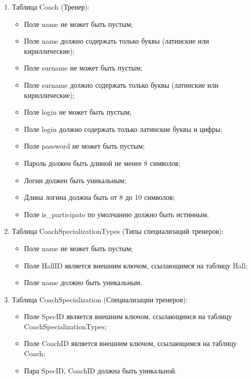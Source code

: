\begin{enumerate}
    \item Таблица Coach (Тренер):
    \begin{itemize}
        \item[---] Поле name не может быть пустым;
        \item[---] Поле name должно содержать только буквы (латинские или кириллические);
        \item[---] Поле surname не может быть пустым;
        \item[---] Поле surname должно содержать только буквы (латинские или кириллические);
        \item[---] Поле login не может быть пустым;
        \item[---] Поле login должно содержать только латинские буквы и цифры;
        \item[---] Поле password не может быть пустым;
        \item[---] Пароль должен быть длиной не менее 8 символов;
        \item[---] Логин должен быть уникальным;
        \item[---] Длина логина должна быть от 8 до 10 символов;
        \item[---] Поле is\_participate по умолчанию должно быть истинным.
    \end{itemize}

    \item Таблица CoachSpecializationTypes (Типы специализаций тренеров):
    \begin{itemize}
        \item[---] Поле name не может быть пустым;
        \item[---] Поле HallID является внешним ключом, ссылающимся на таблицу Hall;
        \item[---] Поле name должно быть уникальным. 
    \end{itemize}

    \item Таблица CoachSpecialization (Специализации тренеров):
    \begin{itemize}
        \item[---] Поле SpecID является внешним ключом, ссылающимся на таблицу CoachSpecializationTypes;
        \item[---] Поле CoachID является внешним ключом, ссылающимся на таблицу Coach;
        \item[---] Пара SpecID, CoachID должна быть уникальной.
    \end{itemize}


\end{enumerate}
